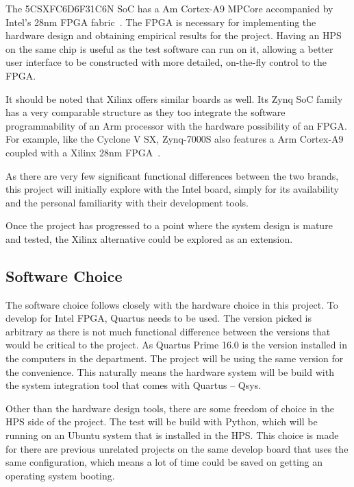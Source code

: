 \documentclass[journal]{IEEEtran}
\begin{document}
The 5CSXFC6D6F31C6N SoC has a Am Cortex-A9 MPCore accompanied by Intel's 28nm
FPGA fabric~\cite{Cy5DBRM}.
The FPGA is necessary for implementing the hardware design and obtaining
empirical results for the project.
Having an HPS on the same chip is useful as the test software can run on it,
allowing a better user interface to be constructed with more detailed,
on-the-fly control to the FPGA.

It should be noted that Xilinx offers similar boards as well. Its Zynq SoC
family has a very comparable structure as they too integrate the software
programmability of an Arm processor with the hardware possibility of an FPGA.
For example, like the Cyclone V SX, Zynq-7000S also features a Arm Cortex-A9
coupled with a Xilinx 28nm FPGA~\cite{ZynqBrief}.

As there are very few significant functional differences between the two brands,
this project will initially explore with the Intel board, simply for its
availability and the personal familiarity with their development tools.

Once the project has progressed to a point where the system design is mature and
tested, the Xilinx alternative could be explored as an extension.

\subsection{Software Choice}
The software choice follows closely with the hardware choice in this project.
To develop for Intel FPGA, Quartus needs to be used.
The version picked is arbitrary as there is not much functional difference
between the versions that would be critical to the project.
As Quartus Prime 16.0 is the version installed in the computers in the
department.
The project will be using the same version for the convenience.
This naturally means the hardware system will be build with the system
integration tool that comes with Quartus -- Qsys.

Other than the hardware design tools, there are some freedom of choice in the
HPS side of the project.
The test will be build with Python, which will be running on an Ubuntu system
that is installed in the HPS.
This choice is made for there are previous unrelated projects on the same
develop board that uses the same configuration, which means a lot of time
could be saved on getting an operating system booting.
\end{document}
